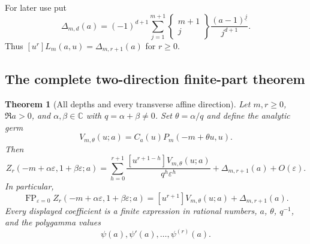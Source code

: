 \documentclass[11pt,a4paper]{article}
\newtheorem{theorem}{Theorem}[section]
\theoremstyle{definition}
\theoremstyle{remark}
\numberwithin{equation}{section}
\begin{document}
For later use put
\begin{equation}\label{h2:eq:Delta}
 \Delta_{m,d}(a)=(-1)^{d+1}\sum_{j=1}^{m+1}
  \left\{\begin{matrix}m+1\\j\end{matrix}\right\}
                      \frac{(a-1)^{\underline j}}{j^{d+1}}.
\end{equation}
Thus $[u^r]L_m(a,u)=\Delta_{m,r+1}(a)$ for $r\ge0$.

\subsection{The complete two-direction finite-part theorem}

\begin{theorem}[All depths and every transverse affine direction]
\label{h2:thm:direction}
Let $m,r\ge0$, $\Re a>0$, and $\alpha,\beta\in\mathbb C$ with
$q=\alpha+\beta\ne0$. Set $\theta=\alpha/q$ and define the analytic
germ
\begin{equation}\label{h2:eq:V}
 V_{m,\theta}(u;a)=C_a(u)P_m(-m+\theta u,u).
\end{equation}
Then
\begin{equation}\label{h2:eq:main}
 \boxed{\displaystyle
 Z_r(-m+\alpha\varepsilon,1+\beta\varepsilon;a)
 =\sum_{h=0}^{r+1}
     \frac{[u^{r+1-h}]V_{m,\theta}(u;a)}
          {q^h\varepsilon^h}
      +\Delta_{m,r+1}(a)+O(\varepsilon).}
\end{equation}
In particular,
\begin{equation}\label{h2:eq:FP}
 \operatorname{FP}_{\varepsilon=0}
 Z_r(-m+\alpha\varepsilon,1+\beta\varepsilon;a)
 =[u^{r+1}]V_{m,\theta}(u;a)+\Delta_{m,r+1}(a).
\end{equation}
Every displayed coefficient is a finite expression in rational numbers,
$a$, $\theta$, $q^{-1}$, and the polygamma values
\[
 \psi(a),\psi'(a),\ldots,\psi^{(r)}(a).
\]
\end{theorem}
\end{document}
